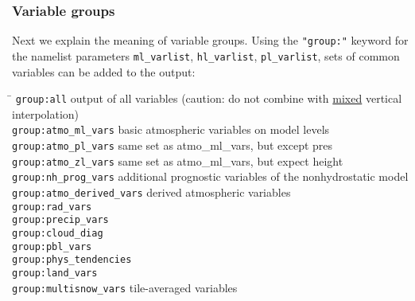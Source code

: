 \subsubsection{Variable groups}
Next we explain the meaning of variable groups.
Using the \texttt{"group:"} keyword for the namelist parameters \texttt{ml\_varlist}, \texttt{hl\_varlist}, \texttt{pl\_varlist},
sets of common variables can be added to the output:
\begin{tabbing}
\hspace*{0.4\textwidth} \= \kill
\texttt{group:all}                     \>      output of all variables (caution: do not combine with \underline{mixed} vertical interpolation) \\
\texttt{group:atmo\_ml\_vars}          \>      basic atmospheric variables on model levels                          \\
\texttt{group:atmo\_pl\_vars}          \>      same set as atmo\_ml\_vars, but except pres\\
\texttt{group:atmo\_zl\_vars}          \>      same set as atmo\_ml\_vars, but expect height\\
\texttt{group:nh\_prog\_vars}          \>      additional prognostic variables of the nonhydrostatic model          \\
\texttt{group:atmo\_derived\_vars}     \>      derived atmospheric variables                                        \\
\texttt{group:rad\_vars}               \>                                                                           \\
\texttt{group:precip\_vars}            \>                                                                           \\
\texttt{group:cloud\_diag}             \>                                                                           \\
\texttt{group:pbl\_vars}               \>                                                                           \\
\texttt{group:phys\_tendencies}        \>                                                                           \\
\texttt{group:land\_vars}              \>                                                                           \\
\texttt{group:multisnow\_vars}         \>     tile-averaged variables
\end{tabbing}



